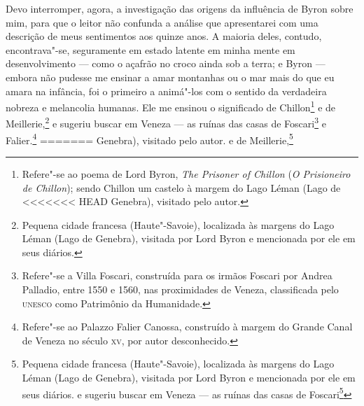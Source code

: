{{{{{{{{{{{{{{{{{{{{{{{{{{{{{{{{{{{{{{{{{{{{{{{{{{{{{{{{%
Devo interromper, agora, a investigação das origens da influência
de Byron sobre mim, para que o leitor não confunda a análise que
apresentarei com uma descrição de meus sentimentos aos quinze anos. A
maioria deles, contudo, encontrava"-se, seguramente em estado latente em
minha mente em desenvolvimento --- como o açafrão no croco ainda sob a
terra; e Byron --- embora não pudesse me ensinar a amar montanhas ou o
mar mais do que eu amara na infância, foi o primeiro a animá"-los com o
sentido da verdadeira nobreza e melancolia humanas. Ele me ensinou o \label{chillon}
significado de Chillon\footnote{Refere"-se ao poema de Lord Byron, 
  \textit{The Prisoner of Chillon} (\textit{O Prisioneiro de
  Chillon}); sendo Chillon um castelo à margem do Lago Léman (Lago de
<<<<<<< HEAD
  Genebra), visitado pelo autor.} e de
Meillerie,\footnote{Pequena cidade francesa (Haute"-Savoie), localizada às
  margens do Lago Léman (Lago de Genebra), visitada por Lord Byron e
  mencionada por ele em seus diários.} e sugeriu buscar
em Veneza --- as ruínas das casas de Foscari\footnote{Refere"-se a Villa
  Foscari, construída para os irmãos Foscari por Andrea Palladio, entre
  1550 e 1560, nas proximidades de Veneza, classificada pelo \textsc{unesco} como
  Patrimônio da Humanidade.} e Falier.\footnote{Refere"-se
  ao Palazzo Falier Canossa, construído à margem do Grande Canal de
  Veneza no século \textsc{xv}, por autor desconhecido.}
=======
  Genebra), visitado pelo autor.  e de
Meillerie,\footnote{Pequena cidade francesa (Haute"-Savoie), localizada às
  margens do Lago Léman (Lago de Genebra), visitada por Lord Byron e
  mencionada por ele em seus diários.  e sugeriu buscar
em Veneza --- as ruínas das casas de Foscari\footnote{Refere"-se a Villa
  Foscari, construída para os irmãos Foscari por Andrea Palladio, entre
  1550 e 1560, nas proximidades de Veneza, classificada pelo \textsc{unesco} como
  Patrimônio da Humanidade.  e Falier.\footnote{Refere"-se
  ao Palazzo Falier Canossa, construído à margem do Grande Canal de
  Veneza no século \textsc{xv}, por autor desconhecido. 
>>>>>>> 7ef31cc2a6d5603f856fee4c85bc83700040648c

}}}}}}}}}}}}}}}}}}}}}}}}}}}}}}}}}}}}}}}}}}}}}}}}}}}}}}}}}}}
